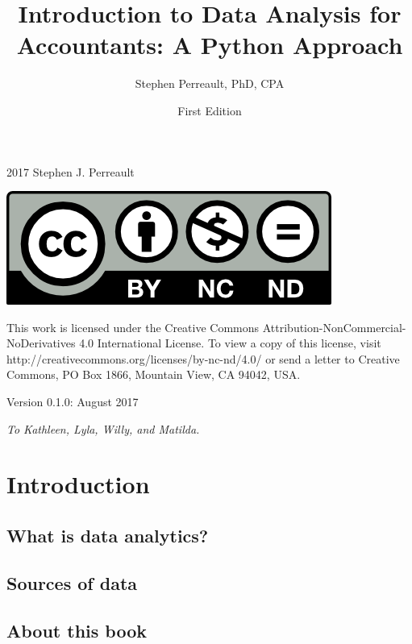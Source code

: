 \documentclass{book}
\begin{document}
\frontmatter
\pagestyle{plain}
\begin{titlepage}
	\title {\huge \textbf{Introduction to Data Analysis for Accountants: A Python Approach}}
	\date{First Edition}
	\author{Stephen Perreault, PhD, CPA}
	\maketitle
\end{titlepage}
\begingroup
	\parindent 0pt
	\parskip \baselineskip 
	\textcopyright{} 2017 Stephen J. Perreault 
	
	\begin {center}
	\includegraphics  [scale=1.5]{creative_commons_license}
	\end {center}
	
	This work is licensed under the Creative Commons Attribution-NonCommercial-NoDerivatives 4.0 International License. To view a copy of this license, visit http://creativecommons.org/licenses/by-nc-nd/4.0/ or send a letter to Creative Commons, PO Box 1866, Mountain View, CA 94042, USA.
	
	Version 0.1.0: August 2017
\endgroup
\tableofcontents

\begin {center}
\newpage
\textit{
To Kathleen, Lyla, Willy, and Matilda.}
\end {center}

\mainmatter	
\parindent 0pt
\parskip \baselineskip 

\chapter{Introduction}
\section{What is data analytics?}
\section{Sources of data}
\section{About this book}
\end{document}
